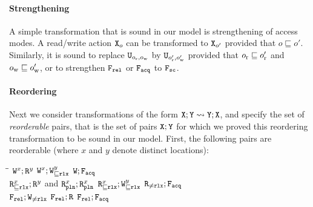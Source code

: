  \paragraph{Strengthening}
A simple transformation that is sound in our model is strengthening of access modes.
A read/write action $\texttt{X}_o$ can be transformed to $\texttt{X}_{o'}$
provided that $o \sqsubseteq o'$. Similarly, 
it is sound to replace  $\texttt{U}_{o_{\text{r}},o_{\text{w}}}$ by $\texttt{U}_{o'_{\text{r}},o'_{\text{w}}}$ provided that 
$o_{\text{r}} \sqsubseteq o'_{\text{r}}$ and $o_{\text{w}} \sqsubseteq o'_{\text{w}}$,
or to strengthen $\texttt{F}_{\texttt{rel}}$ or $\texttt{F}_{\texttt{acq}}$ to $\texttt{F}_{\texttt{sc}}$.

\paragraph{Reordering}
Next we consider transformations of the form  $\texttt{X} ; \texttt{Y} \leadsto \texttt{Y};\texttt{X}$,
and specify the set of \emph{reorderable} pairs, that is
the set of pairs $\texttt{X};\texttt{Y}$ for which we proved this reordering transformation to be sound in our model. 
First, the following pairs  are reorderable (where $x$ and $y$ denote distinct locations):
{\begin{tabbing}
\hspace{5cm}\= \hspace{3cm}\=\kill
\sbul $\texttt{W}^x;\texttt{R}^y$ \> 
\sbul  $\texttt{W}^x;\texttt{W}^y_{\sqsubseteq \texttt{rlx}}$  \>
\sbul$\texttt{W};\texttt{F}_{\texttt{acq}}$ \\[1mm]
\sbul $\texttt{R}^x_{\sqsubseteq \texttt{rlx}};\texttt{R}^y$ and $\texttt{R}^x_{\texttt{pln}};\texttt{R}^x_{\texttt{pln}}$ \>
\sbul $\texttt{R}^x_{\sqsubseteq \texttt{rlx}};\texttt{W}^y_{\sqsubseteq \texttt{rlx}}$ \>
\sbul $\texttt{R}_{\neq \texttt{rlx}};\texttt{F}_{\texttt{acq}}$ \\[1mm]
\sbul  $\texttt{F}_{\texttt{rel}};\texttt{W}_{\neq\texttt{rlx}}$   \> \sbul $\texttt{F}_{\texttt{rel}};\texttt{R}$  \> \sbul $\texttt{F}_{\texttt{rel}};\texttt{F}_{\texttt{acq}}$
\end{tabbing} }



